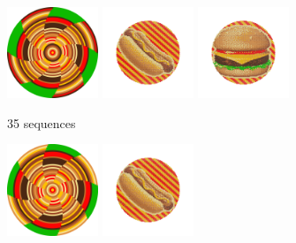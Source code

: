 \documentclass{article}
\begin{document}
\begin{figure}[ht!]

\centering
\begin{subfigure}[t]{0.4\textwidth}
\includegraphics[width=0.3\textwidth]{images/reduction/35/disc.png}
\includegraphics[width=0.3\textwidth]{images/reduction/35/sim0.png}
\includegraphics[width=0.3\textwidth]{images/reduction/35/sim1.png}
\caption{35 sequences}
\end{subfigure}
\hfill
\begin{subfigure}[t]{0.4\textwidth}
\includegraphics[width=0.3\textwidth]{images/reduction/30/disc.png}
\includegraphics[width=0.3\textwidth]{images/reduction/30/sim0.png}

\end{subfigure}
\end{figure}
\end{document}
